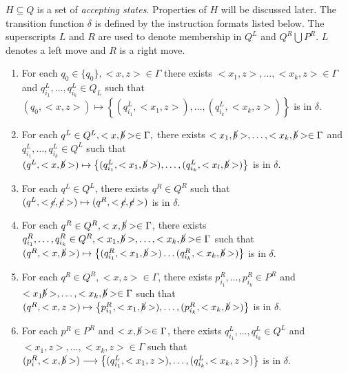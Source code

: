 $H \subseteq Q$ is a set of \emph{accepting states}.
Properties of $H$ will be discussed later.
The transition function $\delta$ is defined by the instruction formats listed below.
The superscripts $L$ and $R$ are used to denote membership in $Q^L$ and $Q^R \bigcup P^R$.
$L$ denotes a left move and $R$ is a right move.
\begin{enumerate}[label=(\roman*)]
    \item \label{itm:start} For each $q_0 \in \{q_0\}, <x,z> \in \Gamma$ there exists
    $<x_1,z>,\ldots,<x_k,z> \in \Gamma$ and $q_{i_1}^L, \ldots, q_{i_k}^L \in Q_L$ 
    such that
    $(q_0, <x,z>) \mapsto \left\{(q_{i_1}^{L}, <x_1,z>), \ldots, (q_{i_k}^L, <x_k,z>)\right\}$
    is in $\delta$.
    \item \label{itm:sweepleft} For each $q^L \in Q^L, <x,\cancel{b}> \in \Gamma,$ there exists
    $<x_1,\cancel{b}>,\dots,<x_k,\cancel{b}> \in \Gamma$ and
    $q_{i_1}^L,\dots,q_{i_k}^L \in Q^L$ such that
    $(q^L, <x,\cancel{b}>) \mapsto \left\{(q_{i_1}^L,<x_1,\cancel{b}>),\dots,(q_{i_k}^L, <x_l,\cancel{b}>)\right\}$ is in $\delta$.
    \item \label{itm:leftreverse} For each $q^L \in Q^L$, there exists $q^R \in Q^R$ such that
    $(q^L, <\cancel{c},\cancel{c}>) \mapsto (q^R,<\cancel{c},\cancel{c}>)$  is in $\delta$.
    \item \label{itm:sweepright} For each $q^R \in Q^R, <x,\cancel{b}> \in \Gamma$, there exists
    $q_{i_1}^R,\ldots,q_{i_k}^R \in Q^R,
    <x_1,\cancel{b}>,\ldots,<x_k,\cancel{b}> \in \Gamma$ such that
    $(q^R,<x,\cancel{b}>) \mapsto \left\{(q_{i_1}^R, <x_1,\cancel{b}>)\ldots
    (q_{i_k}^R, <x_k,\cancel{b}>)\right\}$ is in $\delta$.
    \item \label{itm:extend} For each $q^R \in Q^R, <x,z> \in \Gamma$, there exists
    $p_{i_1}^R,\ldots,p_{i_k}^R \in P^R$ and 
    $<x_1\cancel{b}>,\ldots,<x_k,\cancel{b}> \in \Gamma$ such that
    $(q^R, <x,z>) \mapsto \left\{p_{i_1}^R,<x_1,\cancel{b}>),\ldots,(p_{i_k}^R, <x_k,\cancel{b}>)\right\}$ is in $\delta$.
    \item \label{itm:turnaround} For each $p^R \in P^R$ and $<x,\cancel{b}> \in \Gamma$, there exists
    $q_{i_1}^L,\ldots,q_{i_k}^L \in Q^L$ and 
    $<x_1,z>,\ldots,<x_k,z> \in \Gamma$ such that
    $(p_i^R,<x,\cancel{b}>) \longrightarrow \left\{(q_{i_1}^L,<x_1,z>),\ldots,(q_{i_k}^L,<x_k,z>)\right\} $
    is in $\delta$.
\end{enumerate}


